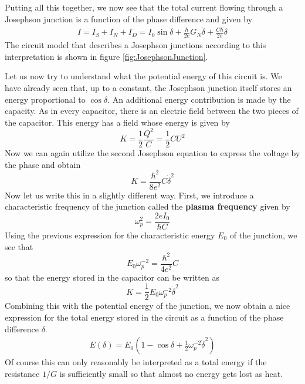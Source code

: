\documentclass[a4paper, draft]{article}
\theoremstyle{own}
\theoremstyle{remark}
\begin{document}
Putting all this together, we now see that the total current flowing through a Josephson junction is a function of the phase difference and given by
\begin{align}
\label{eq:totalcurrent}
I = I_S + I_N + I_D = I_0 \sin \delta + \frac{\hbar}{2e} G_N \dot{\delta} + \frac{C \hbar}{2e} \ddot{\delta}
\end{align}
The circuit model that describes a Josephson junctions according to this interpretation is shown in figure \ref{fig:JosephsonJunction}. 

Let us now try to understand what the potential energy of this circuit is. We have already seen that, up to a constant, the Josephson junction itself stores an energy proportional to $\cos \delta$. An additional energy contribution is made by the capacity. As in every capacitor, there is an electric field between the two pieces of the capacitor. This energy has a field whose energy is given by
$$
K = \frac{1}{2} \frac{Q^2}{C} = \frac{1}{2} C U^2
$$
Now we can again utilize the second Josephson equation to express the voltage by the phase and obtain
$$
K = \frac{\hbar^2}{8e^2} C \dot{\delta}^2
$$
Now let us write this in a slightly different way. First, we introduce a characteristic frequency of the junction called the {\bf plasma frequency} given by
$$
\omega_p^2 = \frac{2e I_0}{\hbar C}
$$
Using the previous expression for the characteristic energy $E_0$ of the junction, we see that
$$
E_0 \omega_p^{-2} = \frac{\hbar^2}{4e^2} C
$$
so that the energy stored in the capacitor can be written as
$$
K = \frac{1}{2} E_0 \omega_p^{-2} \dot{\delta}^2
$$
Combining this with the potential energy of the junction, we now obtain a nice expression for the total energy stored in the circuit as a function of the phase difference $\delta$.
\begin{align}
\label{eq:junctionenergy}
E(\delta) = E_0(1 - \cos \delta +\frac{1}{2} \omega_p^{-2} \dot{\delta}^2)
\end{align}
Of course this can only reasonably be interpreted as a total energy if the resistance $1 / G$ is sufficiently small so that almost no energy gets lost as heat. 
\end{document}
